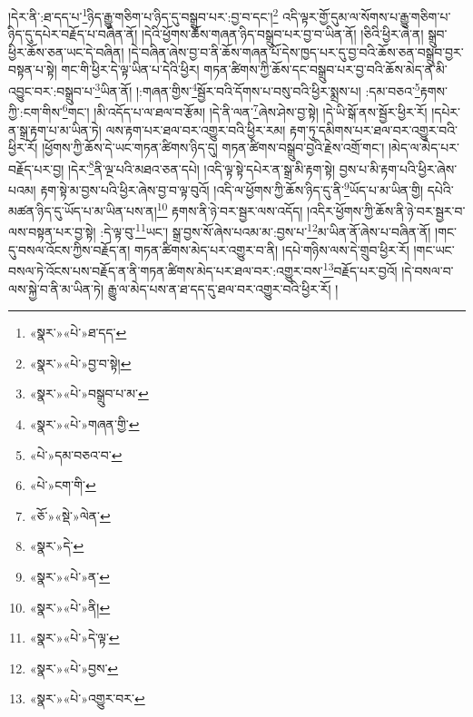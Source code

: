།དེར་ནི་:ཐ་དད་པ་\footnote{«སྣར་»«པེ་»ཐ་དད་}ཉིད་རྒྱུ་གཅིག་པ་ཉིད་དུ་བསྒྲུབ་པར་:བྱ་བ་དང་།\footnote{«སྣར་»«པེ་»བྱ་བ་སྟེ།} འདི་ལྟར་གྱོ་དུམ་ལ་སོགས་པ་རྒྱུ་གཅིག་པ་ཉིད་དུ་དཔེར་བརྗོད་པ་བཞིན་ནོ། །དེའི་ཕྱོགས་ཆོས་གཞན་ཉིད་བསྒྲུབ་པར་བྱ་བ་ཡིན་ནོ། །ཅིའི་ཕྱིར་ཞེ་ན། སྒྲུབ་ཕྱིར་ཆོས་ཅན་ཡང་དེ་བཞིན། །དེ་བཞིན་ཞེས་བྱ་བ་ནི་ཆོས་གཞན་པོ་དེས་ཁྱད་པར་དུ་བྱ་བའི་ཆོས་ཅན་བསྒྲུབ་བྱར་བསྟན་པ་སྟེ། གང་གི་ཕྱིར་དེ་ལྟ་ཡིན་པ་དེའི་ཕྱིར། གཏན་ཚིགས་ཀྱི་ཆོས་དང་བསྒྲུབ་པར་བྱ་བའི་ཆོས་མེད་ན་མི་འབྱུང་བར་:བསྒྲུབ་པ་\footnote{«སྣར་»«པེ་»བསྒྲུབ་པ་མ་}ཡིན་ནོ། །:གཞན་གྱིས་\footnote{«སྣར་»«པེ་»གཞན་གྱི་}སྦྱོར་བའི་དོགས་པ་བསུ་བའི་ཕྱིར་སྨྲས་པ། :དམ་བཅའ་\footnote{«པེ་»དམ་བཅའ་བ་}རྟགས་ཀྱི་:ངག་གིས་\footnote{«པེ་»ངག་གི་}གང་། །མི་འདོད་པ་ལ་ཐལ་བ་རྩོམ། །དེ་ནི་ལན་\footnote{«ཅོ་»«སྡེ་»ལེན་}ཞེས་ཤེས་བྱ་སྟེ། །དེ་ཡི་སྒོ་ནས་སྦྱོར་ཕྱིར་རོ། །དཔེར་ན་སྒྲ་རྟག་པ་མ་ཡིན་ཏེ། ལས་རྟག་པར་ཐལ་བར་འགྱུར་བའི་ཕྱིར་རམ། རྟག་ཏུ་དམིགས་པར་ཐལ་བར་འགྱུར་བའི་ཕྱིར་རོ། །ཕྱོགས་ཀྱི་ཆོས་དེ་ཡང་གཏན་ཚིགས་ཉིད་དུ། གཏན་ཚིགས་བསྒྲུབ་བྱའི་རྗེས་འགྲོ་གང་། །མེད་ལ་མེད་པར་བརྗོད་པར་བྱ། །དེར་\footnote{«སྣར་»དེ་}ནི་ལྔ་པའི་མཐའ་ཅན་དཔེ། །འདི་ལྟ་སྟེ་དཔེར་ན་སྒྲ་མི་རྟག་སྟེ། བྱས་པ་མི་རྟག་པའི་ཕྱིར་ཞེས་པའམ། རྟག་སྟེ་མ་བྱས་པའི་ཕྱིར་ཞེས་བྱ་བ་ལྟ་བུའོ། །འདི་ལ་ཕྱོགས་ཀྱི་ཆོས་ཉིད་དུ་ནི་\footnote{«སྣར་»«པེ་»ན་}ཡོད་པ་མ་ཡིན་གྱི། དཔེའི་མཚན་ཉིད་དུ་ཡོད་པ་མ་ཡིན་པས་ན།\footnote{«སྣར་»«པེ་»ནི།} རྟགས་ནི་ཉེ་བར་སྦྱར་ལས་འདོད། །འདིར་ཕྱོགས་ཀྱི་ཆོས་ནི་ཉེ་བར་སྦྱར་བ་ལས་བསྟན་པར་བྱ་སྟེ། :དེ་ལྟ་བུ་\footnote{«སྣར་»«པེ་»དེ་ལྟ་}ཡང་། སྒྲ་བྱས་སོ་ཞེས་པའམ་མ་:བྱས་པ་\footnote{«སྣར་»«པེ་»བྱས་}མ་ཡིན་ནོ་ཞེས་པ་བཞིན་ནོ། །གང་དུ་བསལ་འོངས་ཀྱིས་བརྗོད་ན། གཏན་ཚིགས་མེད་པར་འགྱུར་བ་ནི། །དཔེ་གཉིས་ལས་དེ་གྲུབ་ཕྱིར་རོ། །གང་ཡང་བསལ་ཏེ་འོངས་པས་བརྗོད་ན་ནི་གཏན་ཚིགས་མེད་པར་ཐལ་བར་:འགྱུར་བས་\footnote{«སྣར་»«པེ་»འགྱུར་བར་}བརྗོད་པར་བྱའོ། །དེ་བསལ་བ་ལས་སྐྱེ་བ་ནི་མ་ཡིན་ཏེ། རྒྱུ་ལ་མེད་པས་ན་ཐ་དད་དུ་ཐལ་བར་འགྱུར་བའི་ཕྱིར་རོ། །
